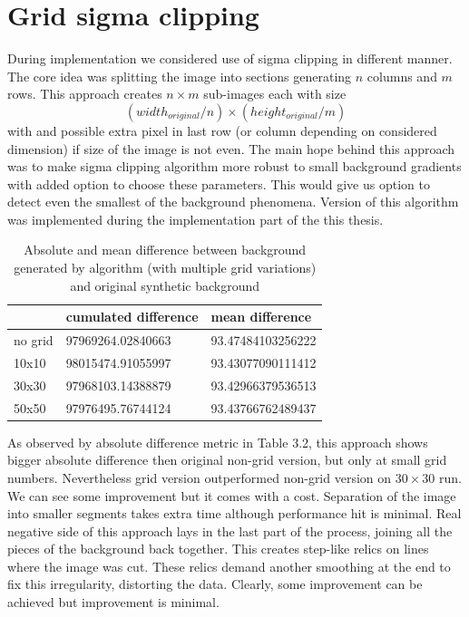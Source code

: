 \documentclass[12pt, a4paper, oneside]{book}
\begin{document}
\section{Grid sigma clipping}
During implementation we considered use of sigma clipping in different manner.
The core idea was splitting the image into sections generating $n$ columns and $m$ rows.
This approach creates $n \times m$ sub-images each with size
\begin{equation}
    (width_{original}/n) \times (height_{original}/m)
\end{equation}
with and possible extra pixel in last row (or column depending on considered dimension) if size of the image is not even.
The main hope behind this approach was to make sigma clipping algorithm more robust to small background gradients with added option to choose these parameters.
This would give us option to detect even the smallest of the background phenomena.
Version of this algorithm was implemented during the implementation part of the this thesis.


\begin{table}[H]
    \centering
\begin{tabular}{|l|l|l|}
\hline
                  & cumulated difference & mean difference\\ \hline
    no grid & 97969264.02840663 & 93.47484103256222 \\ \hline
    10x10 & 98015474.91055997 & 93.43077090111412 \\ \hline
    30x30 & 97968103.14388879 & 93.42966379536513  \\ \hline
    50x50 & 97976495.76744124 & 93.43766762489437 \\ \hline
\end{tabular}
    \caption{Absolute and mean difference between background generated by algorithm (with multiple grid variations) and original synthetic background}
    \label{tab:grid_results}
\end{table}


As observed by absolute difference metric in Table 3.2, this approach shows bigger absolute difference then original non-grid version, but only at small grid numbers. Nevertheless grid version outperformed non-grid version on $30 \times 30$ run.
We can see some improvement but it comes with a cost.
Separation of the image into smaller segments takes extra time although performance hit is minimal.
Real negative side of this approach lays in the last part of the process, joining all the pieces of the background back together.
This creates step-like relics on lines where the image was cut.
These relics demand another smoothing at the end to fix this irregularity, distorting the data.
Clearly, some improvement can be achieved but improvement is minimal.
\end{document}
